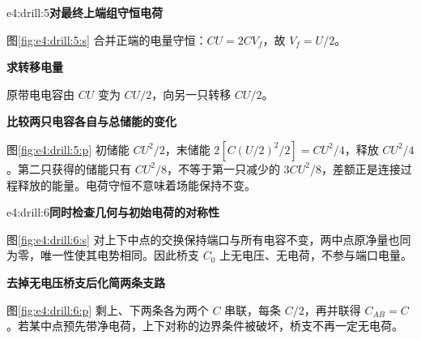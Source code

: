 \begin{drillsolution}{e4:drill:5}\textbf{对最终上端组守恒电荷}\par\nobreak
图\ref{fig:e4:drill:5:s} 合并正端的电量守恒：$CU=2CV_f$，故 $V_f=U/2$。

\par\medskip{}\noindent\textbf{求转移电量}\par\nobreak
原带电电容由 $CU$ 变为 $CU/2$，向另一只转移 $CU/2$。



\par\medskip{}\noindent\textbf{比较两只电容各自与总储能的变化}\par\nobreak
图\ref{fig:e4:drill:5:p} 初储能 $CU^2/2$，末储能 $2[C(U/2)^2/2]=CU^2/4$，释放 $CU^2/4$。第二只获得的储能只有 $CU^2/8$，不等于第一只减少的 $3CU^2/8$，差额正是连接过程释放的能量。电荷守恒不意味着场能保持不变。\end{drillsolution}
\begin{drillsolution}{e4:drill:6}\textbf{同时检查几何与初始电荷的对称性}\par\nobreak
图\ref{fig:e4:drill:6:s} 对上下中点的交换保持端口与所有电容不变，两中点原净量也同为零，唯一性使其电势相同。因此桥支 $C_0$ 上无电压、无电荷，不参与端口电量。



\par\medskip{}\noindent\textbf{去掉无电压桥支后化简两条支路}\par\nobreak
图\ref{fig:e4:drill:6:p} 剩上、下两条各为两个 $C$ 串联，每条 $C/2$，再并联得 $C_{AB}=C$。若某中点预先带净电荷，上下对称的边界条件被破坏，桥支不再一定无电荷。\end{drillsolution}
